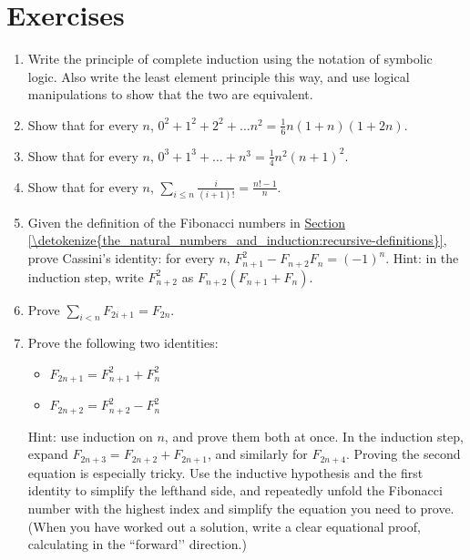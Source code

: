 \documentclass[letterpaper,10pt,english]{sphinxmanual}
\begin{document}
\section{Exercises}
\label{\detokenize{the_natural_numbers_and_induction:exercises}}\begin{enumerate}
%
\item {} 
\sphinxAtStartPar
Write the principle of complete induction using the notation of symbolic logic. Also write the least element principle this way, and use logical manipulations to show that the two are equivalent.

\item {} 
\sphinxAtStartPar
Show that for every \(n\), \(0^2 + 1^2 + 2^2 + \ldots n^2= \frac{1}{6}n(1+n)(1+2n)\).

\item {} 
\sphinxAtStartPar
Show that for every \(n\), \(0^3 + 1^3 + \ldots + n^3 = \frac{1}{4} n^2 (n+1)^2\).

\item {} 
\sphinxAtStartPar
Show that for every \(n\), \(\sum_{i \le n} \frac{i}{(i + 1)!} = \frac{n! - 1}{n}\).

\item {} 
\sphinxAtStartPar
Given the definition of the Fibonacci numbers in \hyperref[\detokenize{the_natural_numbers_and_induction:recursive-definitions}]{Section \ref{\detokenize{the_natural_numbers_and_induction:recursive-definitions}}}, prove Cassini’s identity: for every \(n\), \(F^2_{n+1} - F_{n+2} F_n = (-1)^n\). Hint: in the induction step, write \(F_{n+2}^2\) as \(F_{n+2}(F_{n+1} + F_n)\).

\item {} 
\sphinxAtStartPar
Prove \(\sum_{i < n} F_{2i+1} = F_{2n}\).

\item {} 
\sphinxAtStartPar
Prove the following two identities:
\begin{itemize}
\item {} 
\sphinxAtStartPar
\(F_{2n+1} = F^2_{n+1} + F^2_n\)

\item {} 
\sphinxAtStartPar
\(F_{2n+2} = F^2_{n+2} - F^2_n\)

\end{itemize}

\sphinxAtStartPar
Hint: use induction on \(n\), and prove them both at once. In the induction step, expand \(F_{2n+3} = F_{2n+2} + F_{2n+1}\), and similarly for \(F_{2n+4}\). Proving the second equation is especially tricky. Use the inductive hypothesis and the first identity to simplify the left\sphinxhyphen{}hand side, and repeatedly unfold the Fibonacci number with the highest index and simplify the equation you need to prove. (When you have worked out a solution, write a clear equational proof, calculating in the ``forward’’ direction.)


\end{enumerate}
\end{document}
